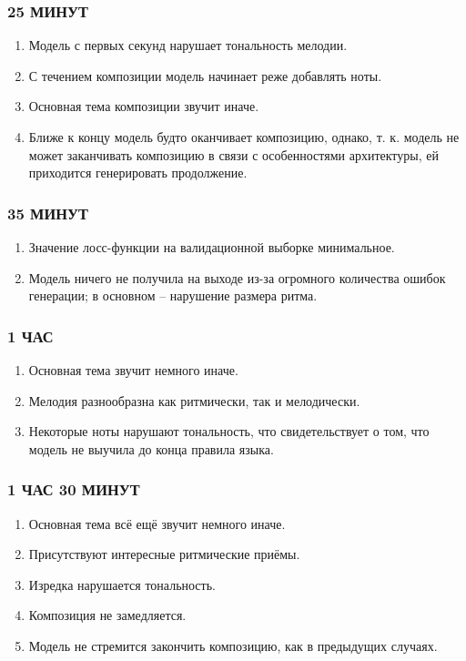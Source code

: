 \subsubsection{25 МИНУТ}
\begin{enumerate}
    \item Модель с первых секунд нарушает тональность мелодии.
    \item С течением композиции модель начинает реже добавлять ноты.
    \item Основная тема композиции звучит иначе.
    \item Ближе к концу модель будто оканчивает композицию, однако, т. к. модель не может заканчивать композицию в связи с особенностями архитектуры, ей приходится генерировать продолжение.
\end{enumerate}

\subsubsection{35 МИНУТ}
\begin{enumerate}
    \item Значение лосс-функции на валидационной выборке минимальное.
    \item Модель ничего не получила на выходе из-за огромного количества ошибок генерации; в основном -- нарушение размера ритма. 
\end{enumerate}
    
\subsubsection{1 ЧАС}
\begin{enumerate}
    \item Основная тема звучит немного иначе.
    \item Мелодия разнообразна как ритмически, так и мелодически.
    \item Некоторые ноты нарушают тональность, что свидетельствует о том, что модель не выучила до конца правила языка.
\end{enumerate}
  
\subsubsection{1 ЧАС 30 МИНУТ}
\begin{enumerate}
    \item Основная тема всё ещё звучит немного иначе.
    \item Присутствуют интересные ритмические приёмы.
    \item Изредка нарушается тональность.
    \item Композиция не замедляется.
    \item Модель не стремится закончить композицию, как в предыдущих случаях.
\end{enumerate}
   
